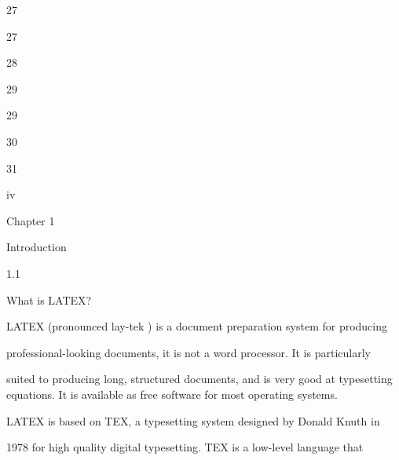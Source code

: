 \documentclass[a4paper,portrait,12pt]{article}
\begin{document}
27


27


28


29


29


30


31





\begin{flushleft}
iv
\end{flushleft}





\begin{flushleft}
\newpage
Chapter 1
\end{flushleft}


\begin{flushleft}
Introduction
\end{flushleft}


1.1





\begin{flushleft}
What is LATEX?
\end{flushleft}





\begin{flushleft}
LATEX (pronounced lay-tek ) is a document preparation system for producing
\end{flushleft}


\begin{flushleft}
professional-looking documents, it is not a word processor. It is particularly
\end{flushleft}


\begin{flushleft}
suited to producing long, structured documents, and is very good at typesetting equations. It is available as free software for most operating systems.
\end{flushleft}


\begin{flushleft}
LATEX is based on TEX, a typesetting system designed by Donald Knuth in
\end{flushleft}


\begin{flushleft}
1978 for high quality digital typesetting. TEX is a low-level language that
\end{flushleft}
\end{document}
